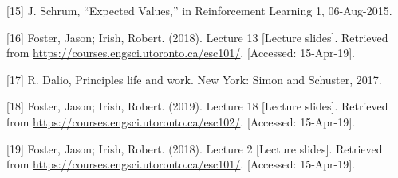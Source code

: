 \documentclass[a4paper,12pt]{article}
\begin{document}
[15] J. Schrum, “Expected Values,” in Reinforcement Learning 1, 06-Aug-2015.

[16] Foster, Jason; Irish, Robert. (2018). Lecture 13 [Lecture slides]. Retrieved from \url{https://courses.engsci.utoronto.ca/esc101/}. [Accessed: 15-Apr-19].

[17] R. Dalio, Principles life and work. New York: Simon and Schuster, 2017.

[18] Foster, Jason; Irish, Robert. (2019). Lecture 18 [Lecture slides]. Retrieved from \url{https://courses.engsci.utoronto.ca/esc102/}. [Accessed: 15-Apr-19].

[19] Foster, Jason; Irish, Robert. (2018). Lecture 2 [Lecture slides]. Retrieved from \url{https://courses.engsci.utoronto.ca/esc101/}. [Accessed: 15-Apr-19].
\end{document}
